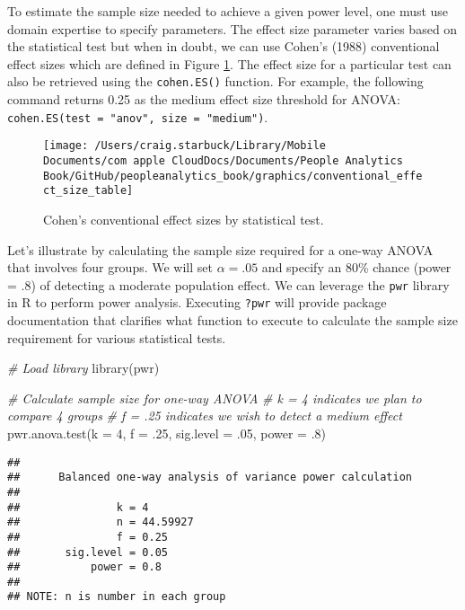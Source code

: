 \documentclass[
]{book}
\newenvironment{Shaded}{\begin{snugshade}}{\end{snugshade}}
\newcommand{\AttributeTok}[1]{\textcolor[rgb]{0.77,0.63,0.00}{#1}}
\newcommand{\CommentTok}[1]{\textcolor[rgb]{0.56,0.35,0.01}{\textit{#1}}}
\newcommand{\DecValTok}[1]{\textcolor[rgb]{0.00,0.00,0.81}{#1}}
\newcommand{\FunctionTok}[1]{\textcolor[rgb]{0.00,0.00,0.00}{#1}}
\newcommand{\NormalTok}[1]{#1}
\begin{document}
To estimate the sample size needed to achieve a given power level, one must use domain expertise to specify parameters. The effect size parameter varies based on the statistical test but when in doubt, we can use Cohen's (1988) conventional effect sizes which are defined in Figure \ref{fig:conv-eff-size-tbl}. The effect size for a particular test can also be retrieved using the \texttt{cohen.ES()} function. For example, the following command returns 0.25 as the medium effect size threshold for ANOVA: \texttt{cohen.ES(test\ =\ "anov",\ size\ =\ "medium")}.

\begin{figure}

{\centering \texttt{[image: /Users/craig.starbuck/Library/Mobile Documents/com~apple~CloudDocs/Documents/People Analytics Book/GitHub/peopleanalytics\_book/graphics/conventional\_effect\_size\_table]} 

}

\caption{Cohen's conventional effect sizes by statistical test.}\label{fig:conv-eff-size-tbl}
\end{figure}

Let's illustrate by calculating the sample size required for a one-way ANOVA that involves four groups. We will set \(\alpha = .05\) and specify an 80\% chance (power = .8) of detecting a moderate population effect. We can leverage the \texttt{pwr} library in R to perform power analysis. Executing \texttt{?pwr} will provide package documentation that clarifies what function to execute to calculate the sample size requirement for various statistical tests.

\begin{Shaded}
\begin{Highlighting}[]
\CommentTok{\# Load library}
\FunctionTok{library}\NormalTok{(pwr)}

\CommentTok{\# Calculate sample size for one{-}way ANOVA}
\CommentTok{\# k = 4 indicates we plan to compare 4 groups}
\CommentTok{\# f = .25 indicates we wish to detect a medium effect}
\FunctionTok{pwr.anova.test}\NormalTok{(}\AttributeTok{k =} \DecValTok{4}\NormalTok{, }\AttributeTok{f =}\NormalTok{ .}\DecValTok{25}\NormalTok{, }\AttributeTok{sig.level =}\NormalTok{ .}\DecValTok{05}\NormalTok{, }\AttributeTok{power =}\NormalTok{ .}\DecValTok{8}\NormalTok{)}
\end{Highlighting}
\end{Shaded}

\begin{verbatim}
## 
##      Balanced one-way analysis of variance power calculation 
## 
##               k = 4
##               n = 44.59927
##               f = 0.25
##       sig.level = 0.05
##           power = 0.8
## 
## NOTE: n is number in each group
\end{verbatim}
\end{document}
